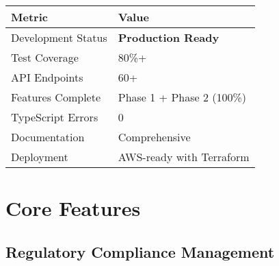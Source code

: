 \documentclass[11pt,a4paper]{article}
\begin{document}
\begin{table}[H]
\centering
\begin{tabular}{ll}
\toprule
\textbf{Metric} & \textbf{Value} \\
\midrule
Development Status & \textcolor{successgreen}{\textbf{Production Ready}} \\
Test Coverage & 80\%+ \\
API Endpoints & 60+ \\
Features Complete & Phase 1 + Phase 2 (100\%) \\
TypeScript Errors & 0 \\
Documentation & Comprehensive \\
Deployment & AWS-ready with Terraform \\
\bottomrule
\end{tabular}
\end{table}

\newpage

\section{Core Features}

\subsection{Regulatory Compliance Management}
\end{document}

